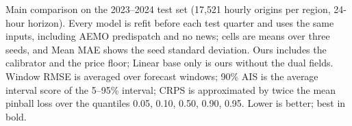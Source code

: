 \providecommand{\materialsdir}{.}
\begin{table}[t]
  \centering
  \caption{Main comparison on the 2023--2024 test set (17{,}521 hourly
    origins per region, 24-hour horizon). Every model is refit before each
    test quarter and uses the same inputs, including AEMO predispatch and no
    news; cells are means over three seeds, and Mean MAE shows the seed
    standard deviation. Ours includes the calibrator and the price floor;
    Linear base only is ours without the dual fields. Window RMSE is averaged
    over forecast windows; 90\% AIS is the average interval score of the
    5--95\% interval; CRPS is approximated by twice the mean pinball loss over
    the quantiles 0.05, 0.10, 0.50, 0.90, 0.95. Lower is better; best in bold.}
  \label{tab:main}
  \small
  
\end{table}
